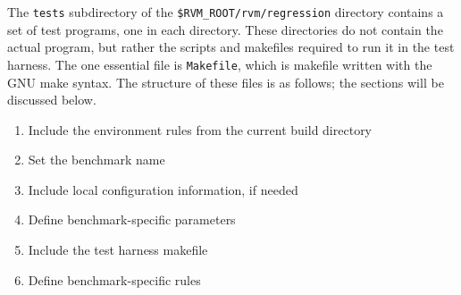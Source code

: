  The {\tt tests} subdirectory of the {\tt{\$RVM\_ROOT/rvm/regression}}
directory contains a set of test programs, one in each directory.
These directories do not contain the actual program, but rather the
scripts and makefiles required to run it in the test harness.  The one
essential file is {\tt{Makefile}}, which is makefile written with the
GNU make syntax.  The structure of these files is as follows; the
sections will be discussed below.  
\begin{enumerate}
\item Include the environment rules from the current build directory
\item Set the benchmark name
\item Include local configuration information, if needed
\item Define benchmark-specific parameters
\item Include the test harness makefile
\item Define benchmark-specific rules
\end{enumerate}

